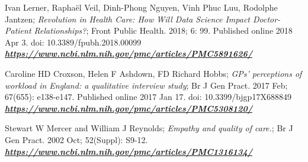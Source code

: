 \documentclass[12pt,a4paper,oneside]{article}
\begin{document}
\begin{thebibliography}{11}
Ivan Lerner, Raphaël Veil, Dinh-Phong Nguyen, Vinh Phuc Luu, Rodolphe Jantzen; \emph{Revolution in Health Care: How Will Data Science Impact Doctor-Patient Relationships?}; Front Public Health. 2018; 6: 99.
Published online 2018 Apr 3. doi:  10.3389/fpubh.2018.00099\\\textbf{\emph{\href{https://www.ncbi.nlm.nih.gov/pmc/articles/PMC5891626/
}{\url{https://www.ncbi.nlm.nih.gov/pmc/articles/PMC5891626/
}}}}

Caroline HD Croxson, Helen F Ashdown, FD Richard Hobbs; \emph{GPs' perceptions of workload in England: a qualitative interview study}; Br J Gen Pract. 2017 Feb; 67(655): e138-e147.
Published online 2017 Jan 17. doi:  10.3399/bjgp17X688849\\\textbf{\emph{\href{https://www.ncbi.nlm.nih.gov/pmc/articles/PMC5308120/
}{\url{https://www.ncbi.nlm.nih.gov/pmc/articles/PMC5308120/}}}}

Stewart W Mercer and William J Reynolds; \emph{Empathy and quality of care.}; Br J Gen Pract. 2002 Oct; 52(Suppl): S9-12. \\\textbf{\emph{\href{https://www.ncbi.nlm.nih.gov/pmc/articles/PMC1316134/
}{\url{https://www.ncbi.nlm.nih.gov/pmc/articles/PMC1316134/}}}}



\end{thebibliography} 
 
\end{document}
